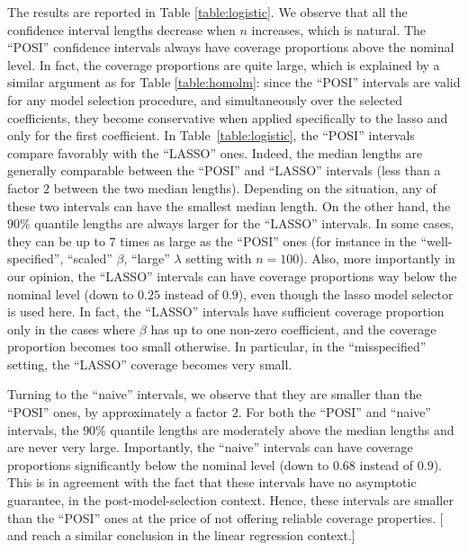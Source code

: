 \documentclass[preprint]{imsart}
\numberwithin{equation}{section}
\begin{document}
The results are reported in Table \ref{table:logistic}. We observe that all the confidence interval lengths decrease when $n$ increases, which is natural. The ``POSI'' confidence intervals always have coverage proportions above the nominal level. In fact, the coverage proportions are quite large, which is explained by a similar argument as for Table \ref{table:homolm}: since the ``POSI'' intervals are valid for any model selection procedure, and simultaneously over the selected coefficients, they become conservative when applied specifically to the lasso and only for the first coefficient. In Table~\ref{table:logistic}, the ``POSI'' intervals compare favorably with the ``LASSO'' ones. Indeed, the median lengths are generally comparable between the ``POSI'' and ``LASSO'' intervals (less than a factor $2$ between the two median lengths). Depending on the situation, any of these two intervals can have the smallest median length. On the other hand, the $90 \%$ quantile lengths are always larger for the ``LASSO'' intervals. In some cases, they can be up to $7$ times as large as the ``POSI'' ones (for instance in the ``well-specified'', ``scaled'' $\beta$, ``large'' $\lambda$ setting with $n=100$). Also, more importantly in our opinion, the ``LASSO'' intervals can have coverage proportions way below the nominal level (down to $0.25$ instead of $0.9$), even though the lasso model selector is used here. In fact, the ``LASSO'' intervals have sufficient coverage proportion only in the cases where $\beta$ has up to one non-zero coefficient, and the coverage proportion becomes too small otherwise. In particular, in the ``misspecified'' setting, the ``LASSO'' coverage becomes very small.

Turning to the ``naive'' intervals, we observe that they are smaller than the ``POSI'' ones, by approximately a factor $2$. For both the ``POSI'' and ``naive'' intervals, the $90 \%$ quantile lengths are moderately above the median lengths and are never very large. Importantly, the ``naive'' intervals can have coverage proportions significantly below the nominal level (down to $0.68$ instead of $0.9$). This is in agreement with the fact that these intervals have no asymptotic guarantee, in the post-model-selection context. Hence, these intervals are smaller than the ``POSI'' ones at the price of not offering reliable coverage properties. [\cite{bachoc14valid} and \cite{leeb13various} reach a similar conclusion in the linear regression context.]
\end{document}
